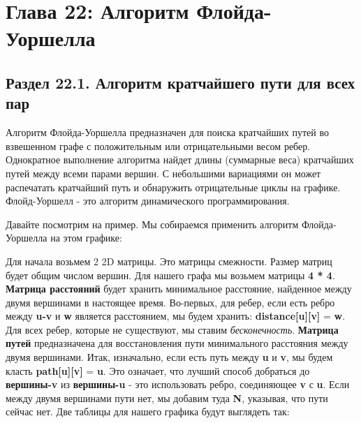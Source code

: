 
\chapter*{Глава 22: Алгоритм Флойда- Уоршелла}
\section*{Раздел 22.1. Алгоритм кратчайшего пути для всех пар}

\vspace{\baselineskip}
Алгоритм Флойда-Уоршелла предназначен для поиска кратчайших путей во взвешенном графе с положительным или отрицательными весом ребер. Однократное выполнение алгоритма найдет длины (суммарные веса) кратчайших путей между всеми парами вершин. С небольшими вариациями он может распечатать кратчайший путь и обнаружить отрицательные циклы на графике. Флойд-Уоршелл - это алгоритм динамического программирования.

Давайте посмотрим на пример. Мы собираемся применить алгоритм Флойда-Уоршелла на этом графике:

\vspace{\baselineskip}
\vspace{\baselineskip}

\vspace{\baselineskip}
Для начала возьмем 2 2D матрицы. Это матрицы смежности. Размер матриц будет общим числом вершин. Для нашего графа мы возьмем матрицы \textbf{4 * 4}. \textbf{Матрица расстояний} будет хранить минимальное расстояние, найденное между двумя вершинами в настоящее время. Во-первых, для ребер, если есть ребро между \textbf{u-v} и \textbf{w} является расстоянием, мы будем хранить: \textbf{distance[u][v]} = \textbf{w}. Для всех ребер, которые не существуют, мы ставим \textit{бесконечность}. \textbf{Матрица путей} предназначена для восстановления пути минимального расстояния между двумя вершинами. Итак, изначально, если есть путь между \textbf{u} и \textbf{v}, мы будем класть \textbf{path[u][v]} = \textbf{u}. Это означает, что лучший способ добраться до \textbf{вершины-v} из \textbf{вершины-u} - это использовать ребро, соединяющее \textbf{v} с \textbf{u}. Если между двумя вершинами пути нет, мы добавим туда \textbf{N}, указывая, что пути сейчас нет. Две таблицы для нашего графика будут выглядеть так:

\newpage

